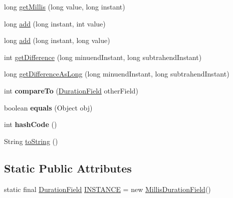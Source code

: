 \begin{DoxyCompactItemize}
long \hyperlink{classorg_1_1joda_1_1time_1_1field_1_1_millis_duration_field_a341fee3644ee73386408da264f889dbc}{get\-Millis} (long value, long instant)
\item 
long \hyperlink{classorg_1_1joda_1_1time_1_1field_1_1_millis_duration_field_a1840a06489bf147b12201e924d0fc476}{add} (long instant, int value)
\item 
long \hyperlink{classorg_1_1joda_1_1time_1_1field_1_1_millis_duration_field_ae9d5dcfcd4da0d0feef198ab058ed0f5}{add} (long instant, long value)
\item 
int \hyperlink{classorg_1_1joda_1_1time_1_1field_1_1_millis_duration_field_ac87abfae8f92616f429e98c2fdbaee20}{get\-Difference} (long minuend\-Instant, long subtrahend\-Instant)
\item 
long \hyperlink{classorg_1_1joda_1_1time_1_1field_1_1_millis_duration_field_a00ef494a65044fa8d1599f8a4dbea921}{get\-Difference\-As\-Long} (long minuend\-Instant, long subtrahend\-Instant)
\item 
\hypertarget{classorg_1_1joda_1_1time_1_1field_1_1_millis_duration_field_a72fca8ea2ed524dd1aa732417b0f4f86}{int {\bfseries compare\-To} (\hyperlink{classorg_1_1joda_1_1time_1_1_duration_field}{Duration\-Field} other\-Field)}\label{classorg_1_1joda_1_1time_1_1field_1_1_millis_duration_field_a72fca8ea2ed524dd1aa732417b0f4f86}

\item 
\hypertarget{classorg_1_1joda_1_1time_1_1field_1_1_millis_duration_field_a056905e661c9b1729548dd1d32212c95}{boolean {\bfseries equals} (Object obj)}\label{classorg_1_1joda_1_1time_1_1field_1_1_millis_duration_field_a056905e661c9b1729548dd1d32212c95}

\item 
\hypertarget{classorg_1_1joda_1_1time_1_1field_1_1_millis_duration_field_a5e01dd1e5cc4d9a994ab29179819cc0a}{int {\bfseries hash\-Code} ()}\label{classorg_1_1joda_1_1time_1_1field_1_1_millis_duration_field_a5e01dd1e5cc4d9a994ab29179819cc0a}

\item 
String \hyperlink{classorg_1_1joda_1_1time_1_1field_1_1_millis_duration_field_a48474fe41d26915d67dbc5c255263445}{to\-String} ()
\end{DoxyCompactItemize}
\subsection*{Static Public Attributes}
\begin{DoxyCompactItemize}
\item 
static final \hyperlink{classorg_1_1joda_1_1time_1_1_duration_field}{Duration\-Field} \hyperlink{classorg_1_1joda_1_1time_1_1field_1_1_millis_duration_field_a4a28ec2bd7bf1dc8a4f32e0ff25622c8}{I\-N\-S\-T\-A\-N\-C\-E} = new \hyperlink{classorg_1_1joda_1_1time_1_1field_1_1_millis_duration_field}{Millis\-Duration\-Field}()
\end{DoxyCompactItemize}


